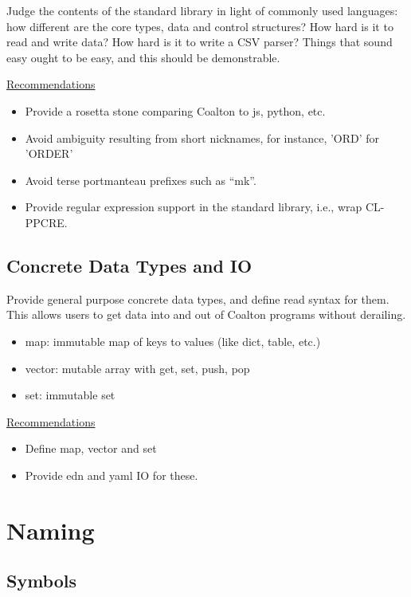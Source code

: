 \documentclass[12pt]{article}
\begin{document}
Judge the contents of the standard library in light of commonly used
languages: how different are the core types, data and control
structures? How hard is it to read and write data? How hard is it to
write a CSV parser? Things that sound easy ought to be easy, and this
should be demonstrable.

\bigskip
\underline{Recommendations}

\begin{itemize}
\item Provide a rosetta stone comparing Coalton to js, python, etc.
\item Avoid ambiguity resulting from short nicknames, for instance,
  'ORD' for 'ORDER'
\item Avoid terse portmanteau prefixes such as ``mk''.
\item Provide regular expression support in the standard library,
  i.e., wrap CL-PPCRE.

\end{itemize}

\subsection{Concrete Data Types and IO}

Provide general purpose concrete data types, and define read syntax
for them. This allows users to get data into and out of Coalton
programs without derailing.

\begin{itemize}
\item map: immutable map of keys to values (like dict, table, etc.)
\item vector: mutable array with get, set, push, pop
\item set: immutable set
\end{itemize}

\bigskip
\underline{Recommendations}
\begin{itemize}
\item Define map, vector and set
\item Provide edn and yaml IO for these.
\end{itemize}

\section{Naming}

\subsection{Symbols}
\end{document}
